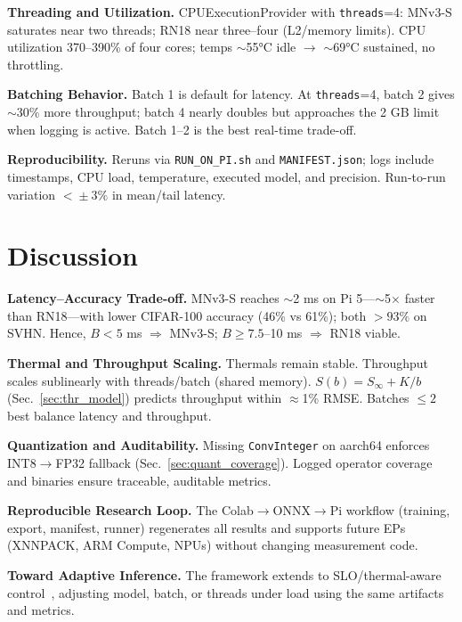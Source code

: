 \documentclass{article}
\begin{document}
\textbf{Threading and Utilization.}
CPUExecutionProvider with \texttt{threads}=4: MNv3-S saturates near two threads; RN18 near three–four (L2/memory limits).  
CPU utilization 370–390\% of four cores; temps $\sim$55°C idle $\rightarrow$ $\sim$69°C sustained, no throttling.

\textbf{Batching Behavior.}
Batch 1 is default for latency.  
At \texttt{threads}=4, batch 2 gives $\sim$30\% more throughput; batch 4 nearly doubles but approaches the 2 GB limit when logging is active.  
Batch 1–2 is the best real-time trade-off.

\textbf{Reproducibility.}
Reruns via \texttt{RUN\_ON\_PI.sh} and \texttt{MANIFEST.json}; logs include timestamps, CPU load, temperature, executed model, and precision.  
Run-to-run variation $<\!\pm3\%$ in mean/tail latency.

\section{Discussion}
\label{sec:discussion}

\textbf{Latency–Accuracy Trade-off.}
MNv3-S reaches $\sim$2 ms on Pi 5—$\sim$5$\times$ faster than RN18—with lower CIFAR-100 accuracy (46\% vs 61\%); both ${>}93\%$ on SVHN.  
Hence, $B{<}5$ ms $\Rightarrow$ MNv3-S; $B{\ge}7.5$–10 ms $\Rightarrow$ RN18 viable.

\textbf{Thermal and Throughput Scaling.}
Thermals remain stable.  
Throughput scales sublinearly with threads/batch (shared memory).  
$S(b){=}S_\infty{+}K/b$ (Sec.~\ref{sec:thr_model}) predicts throughput within $\approx$1\% RMSE.  
Batches $\le2$ best balance latency and throughput.

\textbf{Quantization and Auditability.}
Missing \texttt{ConvInteger} on aarch64 enforces INT8$\to$FP32 fallback (Sec.~\ref{sec:quant_coverage}).  
Logged operator coverage and binaries ensure traceable, auditable metrics.

\textbf{Reproducible Research Loop.}
The Colab$\rightarrow$ONNX$\rightarrow$Pi workflow (training, export, manifest, runner) regenerates all results and supports future EPs (XNNPACK, ARM Compute, NPUs) without changing measurement code.

\textbf{Toward Adaptive Inference.}
The framework extends to SLO/thermal-aware control~\cite{matsubara2022split}, adjusting model, batch, or threads under load using the same artifacts and metrics.
\end{document}
